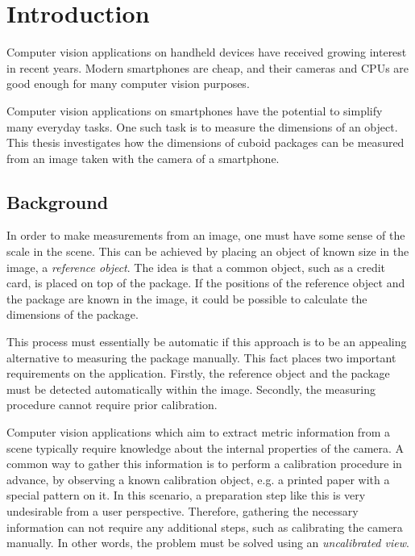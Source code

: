 \chapter{Introduction}
Computer vision applications on handheld devices have received growing interest in recent years. 
Modern smartphones are cheap, and their cameras and CPUs are good enough for many computer vision purposes.

Computer vision applications on smartphones have the potential to simplify many everyday tasks.
One such task is to measure the dimensions of an object.
This thesis investigates how the dimensions of cuboid packages can be measured from an image taken with the camera of a smartphone.

\section{Background}
In order to make measurements from an image, one must have some sense of the scale in the scene.
This can be achieved by placing an object of known size in the image, a \textit{reference object}.
The idea is that a common object, such as a credit card, is placed on top of the package.
If the positions of the reference object and the package are known in the image, it could be possible to calculate the dimensions of the package.

This process must essentially be automatic if this approach is to be an appealing alternative to measuring the package manually.
This fact places two important requirements on the application. Firstly, the reference object and the package must be detected automatically within the image. Secondly, the measuring procedure cannot require prior calibration.

Computer vision applications which aim to extract metric information from a scene typically require knowledge about the internal properties of the camera.
A common way to gather this information is to perform a calibration procedure in advance, by observing a known calibration object, e.g. a printed paper with a special pattern on it.
In this scenario, a preparation step like this is very undesirable from a user perspective.
Therefore, gathering the necessary information can not require any additional steps, such as calibrating the camera manually.
In other words, the problem must be solved using an \textit{uncalibrated view}.


